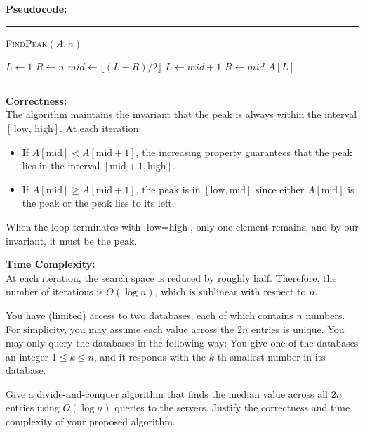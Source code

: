 \documentclass[11pt]{article}
\begin{document}
    \bigskip
    
    \textbf{Pseudocode:}

    \par\noindent\rule{\textwidth}{0.4pt}
    \smallskip        
    \textsc{FindPeak}$(A, n)$
    \begin{algorithmic}[1]
        \STATE $L \gets 1$
        \STATE $R \gets n$
            \STATE $mid \gets \lfloor (L+R)/2 \rfloor$
                \STATE $L \gets mid+1$
            \ELSE
                \STATE $R \gets mid$
            \ENDIF
        \ENDWHILE
        \RETURN $A[L]$
    \end{algorithmic}
    \vspace{-2mm}
    \par\noindent\rule{\textwidth}{0.4pt}
    
    \bigskip
    
    \textbf{Correctness:} \\
    The algorithm maintains the invariant that the peak is always within the interval \([\,\text{low},\, \text{high}]\). At each iteration:
    \begin{itemize}
        \item If \( A[\text{mid}] < A[\text{mid}+1] \), the increasing property guarantees that the peak lies in the interval \([\text{mid}+1, \text{high}]\).
        \item If \( A[\text{mid}] \geq A[\text{mid}+1] \), the peak is in \([\text{low}, \text{mid}]\) since either \( A[\text{mid}] \) is the peak or the peak lies to its left.
    \end{itemize}
    When the loop terminates with \( \text{low} = \text{high} \), only one element remains, and by our invariant, it must be the peak.
    
    \bigskip
    
    \textbf{Time Complexity:} \\
    At each iteration, the search space is reduced by roughly half. Therefore, the number of iterations is \( O(\log n) \), which is sublinear with respect to \( n \).
    
    \newpage
    
    \begin{tcolorbox}[title={Problem 2 (Two-Server Search, 35 pts)}]
        You have (limited) access to two databases, each of which contains $n$ numbers. For simplicity, you may assume each value across the $2n$ entries is unique. You may only query the databases in the following way: You give one of the databases an integer $1\leq k \leq n$, and it responds with the $k$-th smallest number in its database.
        \medskip
        
        Give a divide-and-conquer algorithm that finds the median value across all $2n$ entries using $O(\log n)$ queries to the servers. Justify the correctness and time complexity of your proposed algorithm.
    \end{tcolorbox}
\end{document}
